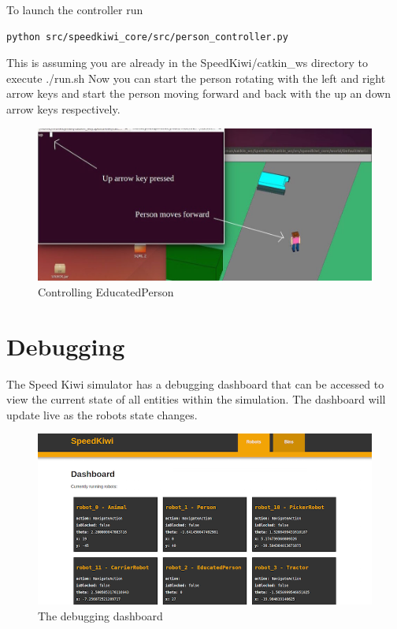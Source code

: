 \documentclass{article}
\begin{document}
To launch the controller run
\begin{verbatim}
python src/speedkiwi_core/src/person_controller.py
\end{verbatim}

This is assuming you are already in the SpeedKiwi/catkin\_ws directory to execute ./run.sh
Now you can start the person rotating with the left and right arrow keys and start the person moving forward and back with the up an down arrow keys respectively.

\begin{figure}[ht]\centering
\includegraphics[scale=0.45]{control}
\caption{Controlling EducatedPerson}
\label{fig:results}
\end{figure}


\section{Debugging}

The Speed Kiwi simulator has a debugging dashboard that can be accessed to view the current state of all entities within the simulation. The dashboard will update live as the robots state changes.

\begin{figure}[ht]\centering
\includegraphics[scale=0.5]{dashboard}
\caption{The debugging dashboard}
\label{fig:results}
\end{figure}
\end{document}
